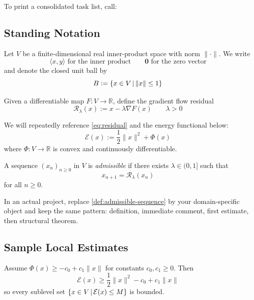 To print a consolidated task list, call:
\listoftodos

\subsection{Standing Notation}
\label{ssec:standing-notation}

Let $V$ be a finite-dimensional real inner-product space with norm $\|\cdot\|$. We write
\[
\langle x,y\rangle \text{ for the inner product} \qquad \mathbf{0} \text{ for the zero vector}
\]
and denote the closed unit ball by
\[
B:=\left\{x\in V\,|\,\|x\|\le 1\right\}
\]

Given a differentiable map $F:V\to\mathbb{R}$, define the gradient flow residual
\begin{equation}
\label{eq:residual}
\mathcal{R}_\lambda(x):=x-\lambda\nabla F(x)\qquad \lambda>0
\end{equation}

We will repeatedly reference \cref{eq:residual} and the energy functional below:
\begin{equation}
\label{eq:energy}
\mathcal{E}(x):=\frac12\|x\|^2+\Phi(x)
\end{equation}
where $\Phi:V\to\mathbb{R}$ is convex and continuously differentiable.

\begin{definition}
\label{def:admissible-sequence}
A sequence $(x_n)_{n\ge 0}$ in $V$ is \emph{admissible} if there exists $\lambda\in(0,1]$ such that
\[
x_{n+1}=\mathcal{R}_\lambda(x_n)
\]
for all $n\ge 0$.
\end{definition}

\begin{remark}
\label{rem:adapt-model}
In an actual project, replace \cref{def:admissible-sequence} by your domain-specific object and keep the same pattern: definition, immediate comment, first estimate, then structural theorem.
\end{remark}

\subsection{Sample Local Estimates}
\label{ssec:local-estimates}

\begin{lemma}
\label{lem:coercive-bound}
Assume $\Phi(x)\ge -c_0+c_1\|x\|$ for constants $c_0,c_1\ge 0$. Then
\[
\mathcal{E}(x)\ge \frac12\|x\|^2-c_0+c_1\|x\|
\]
so every sublevel set $\left\{x\in V\,|\,\mathcal{E}(x)\le M\right\}$ is bounded.
\end{lemma}

